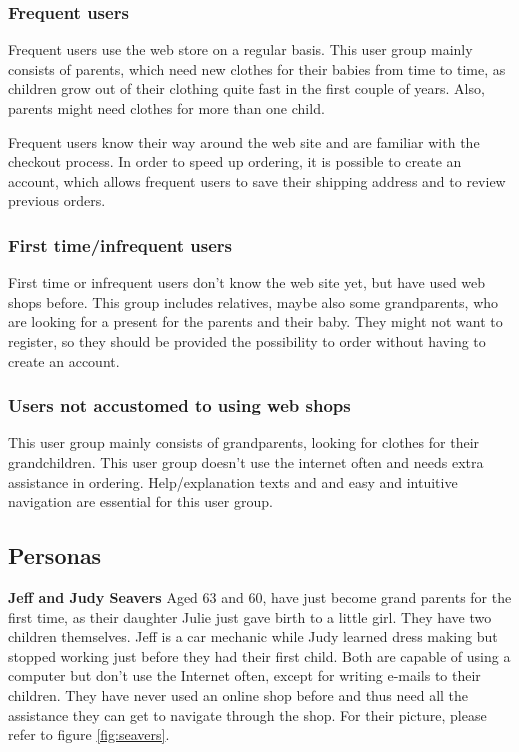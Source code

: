 \subsubsection{Frequent users}
Frequent users use the web store on a regular basis. This user group mainly consists of parents, which need new clothes for their babies from time to time, as children grow out of their clothing quite fast in the first couple of years. Also, parents might need clothes for more than one child.

Frequent users know their way around the web site and are familiar with the checkout process. In order to speed up ordering, it is possible to create an account, which allows frequent users to save their shipping address and to review previous orders.

\subsubsection{First time/infrequent users}
First time or infrequent users don't know the web site yet, but have used web shops before. This group includes relatives, maybe also some grandparents, who are looking for a present for the parents and their baby. They might not want to register, so they should be provided the possibility to order without having to create an account.
 
\subsubsection{Users not accustomed to using web shops}
This user group mainly consists of grandparents, looking for clothes for their grandchildren. This user group doesn't use the internet often and needs extra assistance in ordering. Help/explanation texts and and easy and intuitive navigation are essential for this user group. 

\subsection{Personas}
\textbf{Jeff and Judy Seavers}
Aged 63 and 60, have just become grand parents for the first time, as their daughter Julie just gave birth to a little girl.
They have two children themselves. Jeff is a car mechanic while Judy learned dress making but stopped working just before they had their first child.
Both are capable of using a computer but don't use the Internet often, except for writing e-mails to their children.
They have never used an online shop before and thus need all the assistance they can get to navigate through the shop. For their picture, please refer to figure \ref{fig:seavers}.	

